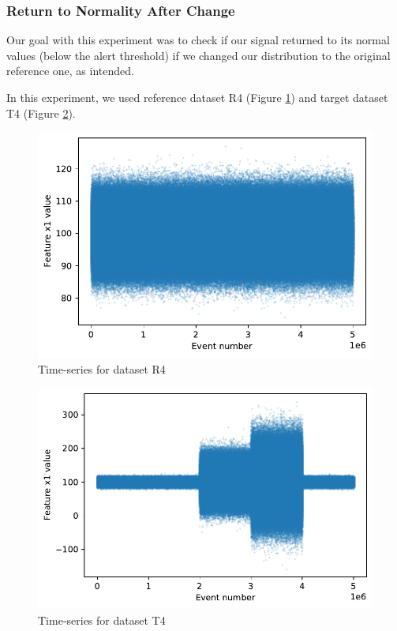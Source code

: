 \documentclass[sigconf]{acmart}
\begin{document}
\subsubsection{Return to Normality After Change}
Our goal with this experiment was to check if our signal returned to its normal values (below the alert threshold) if we changed our distribution to the original reference one, as intended. 

In this experiment, we used reference dataset R4 (Figure \ref{fig:timeseries-r4}) and target dataset T4 (Figure \ref{fig:timeseries-t4}). 
\begin{figure}[!htb]
    \begin{center}
      \includegraphics[scale=0.5]{figures/timeseries-r4.pdf}
      \caption{Time-series for dataset R4}
      \label{fig:timeseries-r4}
    \end{center}
\end{figure}
\begin{figure}[!htb]
    \begin{center}
      \includegraphics[scale=0.5]{figures/timeseries-t4.pdf}
      \caption{Time-series for dataset T4}
     \label{fig:timeseries-t4}
    \end{center}
\end{figure}
\end{document}
